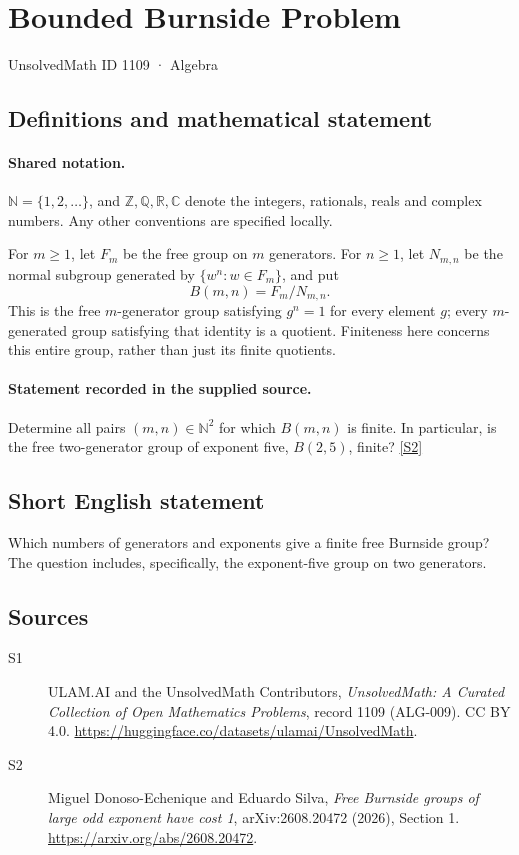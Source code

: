 \documentclass[11pt]{article}
\newcommand{\sref}[2]{\hyperlink{source:#1:#2}{[S#2]}}
\begin{document}
\setcounter{section}{1108}
\section{Bounded Burnside Problem}\label{1109}
{\small\sffamily UnsolvedMath ID 1109 · Algebra}
\subsection{Definitions and mathematical statement}

\paragraph{Shared notation.}$\mathbb N=\{1,2,\ldots\}$, and $\mathbb Z,\mathbb Q,\mathbb R,\mathbb C$ denote the integers, rationals, reals and complex numbers. Any other conventions are specified locally.


For \(m\ge1\), let \(F_m\) be the free group on \(m\) generators.
For \(n\ge1\), let \(N_{m,n}\) be the normal subgroup generated by
\(\{w^n:w\in F_m\}\), and put
\[
 B(m,n)=F_m/N_{m,n}.
\]
This is the free \(m\)-generator group satisfying \(g^n=1\) for every
element \(g\); every \(m\)-generated group satisfying that identity is a quotient.
Finiteness here concerns this entire group, rather than just its finite quotients.
\paragraph{Statement recorded in the supplied source.}
Determine all pairs \((m,n)\in\mathbb N^2\) for which
\(B(m,n)\) is finite.  In particular, is the free two-generator
group of exponent five, \(B(2,5)\), finite? \sref{1109}{2}
\subsection{Short English statement}
Which numbers of generators and exponents give a finite free Burnside group? The question includes, specifically, the exponent-five group on two generators.
\subsection{Sources}
\begin{description}
\item[\hypertarget{source:1109:1}{S1}] ULAM.AI and the UnsolvedMath Contributors, \emph{UnsolvedMath: A Curated Collection of Open Mathematics Problems}, record 1109 (ALG-009). CC BY 4.0. \url{https://huggingface.co/datasets/ulamai/UnsolvedMath}.
\item[\hypertarget{source:1109:2}{S2}] Miguel Donoso-Echenique and Eduardo Silva, \emph{Free Burnside groups of large odd exponent have cost 1}, arXiv:2608.20472 (2026), Section 1. \url{https://arxiv.org/abs/2608.20472}.
\end{description}
\label{end:1109}
\end{document}
